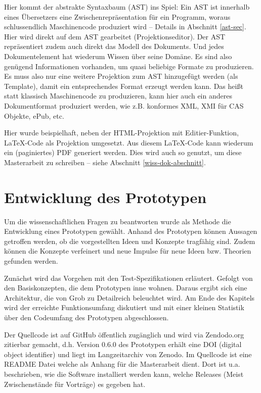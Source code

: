  
Hier kommt der abstrakte Syntaxbaum (AST) ins Spiel: Ein AST ist innerhalb eines Übersetzers eine Zwischenrepräsentation für ein Programm, woraus schlussendlich Maschinencode produziert wird -- Details in Abschnitt \ref{ast-sec}. Hier wird direkt auf dem AST gearbeitet (Projektionseditor). Der AST repräsentiert zudem auch direkt das Modell des Dokuments. Und jedes Dokumentelement hat wiederum Wissen über seine Domäne. Es sind also genügend Informationen vorhanden, um quasi beliebige Formate zu produzieren. Es muss also nur eine weitere Projektion zum AST hinzugefügt werden (als Template), damit ein entsprechendes Format erzeugt werden kann. Das heißt statt klassisch Maschinencode zu produzieren, kann hier auch ein anderes Dokumentformat produziert werden, wie z.B. \citep{NISO} konformes XML, XMI für CAS Objekte, ePub, etc.

 
Hier wurde beispielhaft, neben der HTML-Projektion mit Editier-Funktion, LaTeX-Code als Projektion umgesetzt. Aus diesem LaTeX-Code kann wiederum ein (paginiertes) PDF generiert werden. Dies wird auch so genutzt, um diese Masterarbeit zu schreiben -- siehe Abschnitt \ref{wiss-dok-abschnitt}.

 
\chapter{Entwicklung des Prototypen}\label{}
 
Um die wissenschaftlichen Fragen zu beantworten wurde als Methode die Entwicklung eines Prototypen gewählt. Anhand des Prototypen können Aussagen getroffen werden, ob die vorgestellten Ideen und Konzepte tragfähig sind. Zudem können die Konzepte verfeinert und neue Impulse für neue Ideen bzw. Theorien gefunden werden.

 
Zunächst wird das Vorgehen mit den Test-Spezifikationen erläutert. Gefolgt von den Basiskonzepten, die dem Prototypen inne wohnen. Daraus ergibt sich eine Architektur, die von Grob zu Detailreich beleuchtet wird. Am Ende des Kapitels wird der erreichte Funktionsumfang diskutiert und mit einer kleinen Statistik über den Codeumfang des Prototypen abgeschlossen.

 
Der Quellcode \citep{HodappScaltex} ist auf GitHub öffentlich zugänglich und wird via Zendodo.org zitierbar gemacht, d.h. Version 0.6.0 des Prototypen erhält eine DOI (digital object identifier) und liegt im Langzeitarchiv von Zenodo. Im Quellcode ist eine README Datei welche als Anhang für die Masterarbeit dient. Dort ist u.a. beschrieben, wie die Software installiert werden kann, welche Releases (Meist Zwischenstände für Vorträge) es gegeben hat.

